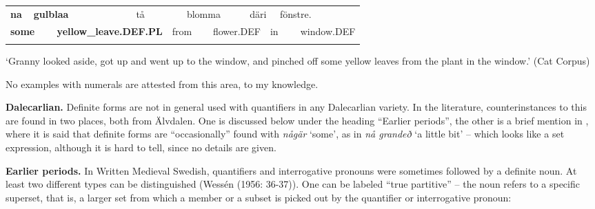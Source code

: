 \begin{tabular}{llllllllllll}
\lsptoprule
{\bfseries na} & \multicolumn{2}{l}{{\bfseries gulblaa}

} & \multicolumn{2}{l}{tå

} & \multicolumn{2}{l}{blomma

} & \multicolumn{2}{l}{däri

} & \multicolumn{2}{l}{fönstre.

} & \\
\multicolumn{2}{l}{{\bfseries some}

} & \multicolumn{2}{l}{{\bfseries yellow\_leave.DEF.PL}

} & \multicolumn{2}{l}{from

} & \multicolumn{2}{l}{flower.DEF

} & \multicolumn{2}{l}{in

} & \multicolumn{2}{l}{window.DEF

}\\
\lspbottomrule
\end{tabular}

\begin{styleTranslation}
‘Granny looked aside, got up and went up to the window, and pinched off some yellow leaves from the plant in the window.’ (Cat Corpus)

\end{styleTranslation}

\begin{styleBodyTextFirst}
No examples with numerals are attested from this area, to my knowledge.

\end{styleBodyTextFirst}

\begin{styleBodytextC}
\textbf{Dalecarlian. }Definite forms are not in general used with quantifiers in any Dalecarlian variety. In the literature, counterinstances to this are found in two places, both from Älvdalen. One is discussed below under the heading “Earlier periods”, the other is a brief mention in \citet[95]{Levander1909}, where it is said that definite forms are “occasionally” found with \textit{någär }‘some’, as in \textit{nå grandeð }‘a little bit’ – which looks like a set expression, although it is hard to tell, since no details are given.

\end{styleBodytextC}

\begin{styleBodytextC}
\textbf{Earlier periods.} In Written Medieval Swedish, quantifiers and interrogative pronouns were sometimes followed by a definite noun. At least two different types can be distinguished (Wessén (1956: 36-37)). One can be labeled “true partitive” – the noun refers to a specific superset, that is, a larger set from which a member or a subset is picked out by the quantifier or interrogative pronoun:

\end{styleBodytextC}

